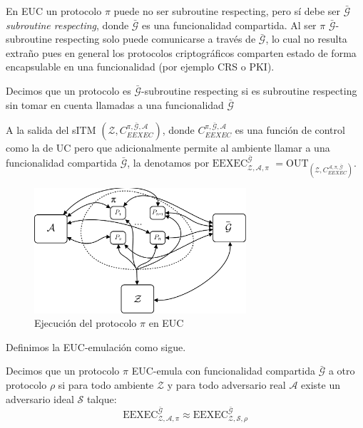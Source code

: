 En EUC un protocolo $\pi$ puede no ser subroutine respecting, pero sí debe ser
$\bar{\mathcal{G}}$\textit{subroutine respecting}, donde $\bar{\mathcal{G}}$ es una funcionalidad compartida.
Al ser $\pi$ $\bar{\mathcal{G}}$-subroutine respecting solo puede comunicarse a través de $\bar{\mathcal{G}}$,
lo cual no resulta extraño pues en general los protocolos criptográficos comparten estado de forma encapsulable
en una funcionalidad (por ejemplo CRS o PKI).

\begin{definicion}
Decimos que un protocolo es $\bar{\mathcal{G}}$-subroutine respecting si es subroutine respecting sin
tomar en cuenta llamadas a una funcionalidad $\bar{\mathcal{G}}$
\end{definicion}

A la salida del sITM $(\mathcal{Z}, C_{EEXEC}^{\pi, \bar{\mathcal{G}}, \mathcal{A}})$, donde
$C_{EEXEC}^{\pi, \bar{\mathcal{G}}, \mathcal{A}}$ es una función de control
como la de UC pero que adicionalmente permite al ambiente llamar a una funcionalidad compartida
$\bar{\mathcal{G}}$, la denotamos por $\mathrm{EEXEC}_{\mathcal{Z}, \mathcal{A}, \mathcal{\pi}}^{\bar{\mathcal{G}}}$
$ = \mathrm{OUT}_{(\mathcal{Z}, C_{EEXEC}^{\mathcal{A}, \pi, \bar{\mathcal{G}}})}$.\\

\begin{figure}[hp]
    \centering
    \includegraphics[width=0.7\textwidth]{figs/mundo_real_euc}
    \caption{Ejecución del protocolo $\pi$ en EUC}
    \label{fig:mundo_real_euc}
\end{figure}

Definimos la EUC-emulación como sigue.

\begin{definicion}
Decimos que un protocolo $\pi$ EUC-emula con funcionalidad compartida $\bar{\mathcal{G}}$ a otro protocolo
$\rho$ si para todo ambiente $\mathcal{Z}$ y para todo adversario real $\mathcal{A}$ existe un adversario
ideal $\mathcal{S}$ talque:
$$\mathrm{EEXEC}_{\mathcal{Z}, \mathcal{A}, \mathcal{\pi}}^{\bar{\mathcal{G}}}
\approx
\mathrm{EEXEC}_{\mathcal{Z}, \mathcal{S}, \mathcal{\rho}}^{\bar{\mathcal{G}}}$$
\end{definicion}

